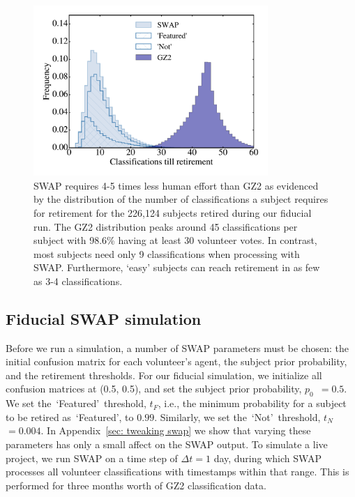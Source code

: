 \documentclass[twocolumn, trackchanges, linenumbers]{aastex6}%
\newcommand{\p}{$p_0$}
\newcommand{\tf}{$t_F$}
\newcommand{\tn}{$t_N$}
\newcommand{\feat}{`Featured'}
\newcommand{\notfeat}{`Not'}
\begin{document}
\begin{figure}[t!] 
\centering
\includegraphics[width=3.5in]{f4.pdf}
\caption{SWAP requires 4-5 times less human effort than GZ2 as evidenced by the distribution of the number of classifications a subject requires for retirement for the 226,124 subjects retired during our fiducial run.  The GZ2 distribution peaks around 45 classifications per subject with 98.6\% having at least 30 volunteer votes. In contrast, most subjects need only 9 classifications when processing with SWAP.  Furthermore,  `easy' subjects can reach retirement in as few as 3-4 classifications. \label{fig: swap vote distributions}}
\end{figure}


\subsection{Fiducial SWAP simulation}\label{sec: fiducial}

Before we run a simulation, a number of SWAP parameters must be chosen: 
 the initial confusion matrix for each volunteer's agent, the subject 
prior probability, and the retirement thresholds. 
For our fiducial  simulation, we initialize all confusion matrices at (0.5, 0.5), 
and set the subject prior probability, \p~$= 0.5$. 
We set the~\feat~threshold, \tf, i.e., the minimum probability for a subject to be retired as~\feat, to $0.99$. Similarly, we set the~\notfeat~threshold, \tn~$= 0.004$. 
In Appendix~\ref{sec: tweaking swap} 
we show that varying these parameters has only a small affect on the SWAP output. 
To simulate a live project, we run SWAP on a time step of $\Delta t = 1$ day, 
during which SWAP processes all volunteer classifications with timestamps 
within that range. This is performed for three months worth of GZ2 classification data. 
\end{document}
